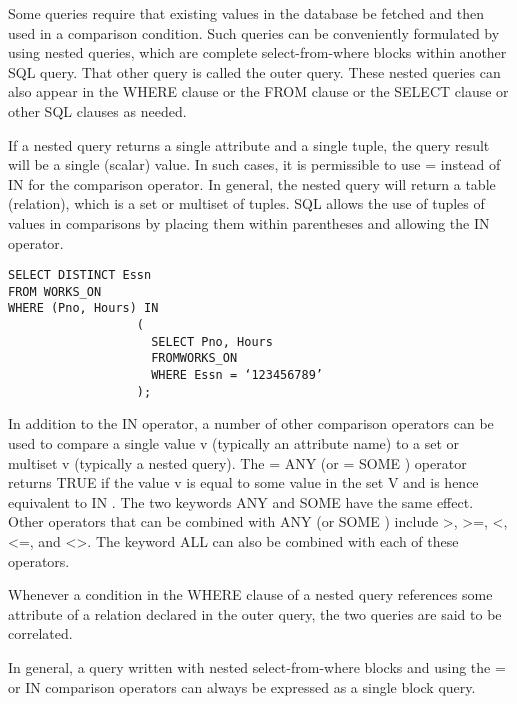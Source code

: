     \par Some queries require that existing values in the database be fetched and then used in a comparison condition. Such queries can be conveniently formulated by using nested queries, which are complete select-from-where blocks within another SQL query. That other query is called the outer query. These nested queries can also appear in the WHERE clause or the FROM clause or the SELECT clause or other SQL clauses as needed.
    \par If a nested query returns a single attribute and a single tuple, the query result will be a single (scalar) value. In such cases, it is permissible to use = instead of IN for the comparison operator. In general, the nested query will return a table (relation), which is a set or multiset of tuples. SQL allows the use of tuples of values in comparisons by placing them within
    parentheses and allowing the IN operator.
    \begin{verbatim}
SELECT DISTINCT Essn
FROM WORKS_ON
WHERE (Pno, Hours) IN
                  (
                    SELECT Pno, Hours
                    FROMWORKS_ON
                    WHERE Essn = ‘123456789’
                  );
    \end{verbatim}
    \par In addition to the IN operator, a number of other comparison operators can be used to compare a single value v (typically an attribute name) to a set or multiset v (typically a nested query). The = ANY (or = SOME ) operator returns TRUE if the value v is equal to some value in the set V and is hence equivalent to IN . The two keywords ANY and SOME have the same effect. Other operators that can be combined with ANY (or SOME ) include >, >=, <, <=, and <>. The keyword ALL can also be combined with each of these operators.

    \par Whenever a condition in the WHERE clause of a nested query references some attribute of a relation declared in the outer query, the two queries are said to be correlated.
    \par In general, a query written with nested select-from-where blocks and using the = or IN comparison operators can always be expressed as a single block query.

